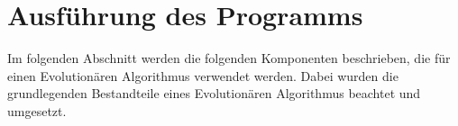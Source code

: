 
\section{Ausf{\"u}hrung des Programms}
\label{ch:Entwurf:sec:Ausf{\"u}hrung des Programms}

Im folgenden Abschnitt werden die folgenden Komponenten beschrieben, die f{\"u}r einen Evolution{\"a}ren Algorithmus verwendet werden. Dabei wurden die grundlegenden Bestandteile eines Evolution{\"a}ren Algorithmus beachtet und umgesetzt. 


